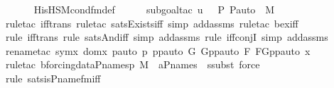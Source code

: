\begin{isabellebody}
\ \ \ \ \isamarkupfalse%
\ His{\isacharunderscore}{\kern0pt}HS{\isacharunderscore}{\kern0pt}M{\isacharunderscore}{\kern0pt}cond{\isacharunderscore}{\kern0pt}fm{\isacharunderscore}{\kern0pt}def\ \isanewline
\ \ \ \ \isamarkupfalse%
{\isacharparenleft}{\kern0pt}subgoal{\isacharunderscore}{\kern0pt}tac\ {\isachardoublequoteopen}{\isasymlangle}u{\isacharcomma}{\kern0pt}\ {\isasymF}{\isacharcomma}{\kern0pt}\ {\isasymG}{\isacharcomma}{\kern0pt}\ P{\isacharcomma}{\kern0pt}\ P{\isacharunderscore}{\kern0pt}auto{\isasymrangle}\ {\isasymin}\ M{\isachardoublequoteclose}{\isacharparenright}{\kern0pt}\isanewline
\ \ \ \ \ \isamarkupfalse%
{\isacharparenleft}{\kern0pt}rule{\isacharunderscore}{\kern0pt}tac\ iff{\isacharunderscore}{\kern0pt}trans{\isacharcomma}{\kern0pt}\ rule{\isacharunderscore}{\kern0pt}tac\ sats{\isacharunderscore}{\kern0pt}Exists{\isacharunderscore}{\kern0pt}iff{\isacharcomma}{\kern0pt}\ simp\ add{\isacharcolon}{\kern0pt}assms{\isacharcomma}{\kern0pt}\ rule{\isacharunderscore}{\kern0pt}tac\ bex{\isacharunderscore}{\kern0pt}iff{\isacharparenright}{\kern0pt}{\isacharplus}{\kern0pt}\isanewline
\ \ \ \ \ \isamarkupfalse%
{\isacharparenleft}{\kern0pt}rule\ iff{\isacharunderscore}{\kern0pt}trans{\isacharcomma}{\kern0pt}\ rule\ sats{\isacharunderscore}{\kern0pt}And{\isacharunderscore}{\kern0pt}iff{\isacharcomma}{\kern0pt}\ simp\ add{\isacharcolon}{\kern0pt}assms{\isacharcomma}{\kern0pt}\ rule\ iff{\isacharunderscore}{\kern0pt}conjI{}{\isacharcomma}{\kern0pt}\ simp\ add{\isacharcolon}{\kern0pt}assms{\isacharparenright}{\kern0pt}{\isacharplus}{\kern0pt}\isanewline
\ \ \ \ \ \ \isamarkupfalse%
{\isacharparenleft}{\kern0pt}rename{\isacharunderscore}{\kern0pt}tac\ symx\ domx\ pauto\ p\ ppauto\ G\ Gppauto\ F\ FGppauto\ x{\isacharparenright}{\kern0pt}\isanewline
\ \ \ \ \ \ \isamarkupfalse%
{\isacharparenleft}{\kern0pt}rule{\isacharunderscore}{\kern0pt}tac\ b{\isacharequal}{\kern0pt}{\isachardoublequoteopen}forcing{\isacharunderscore}{\kern0pt}data{\isachardot}{\kern0pt}P{\isacharunderscore}{\kern0pt}names{\isacharparenleft}{\kern0pt}p{\isacharcomma}{\kern0pt}\ M{\isacharparenright}{\kern0pt}{\isachardoublequoteclose}\ \ a{\isacharequal}{\kern0pt}P{\isacharunderscore}{\kern0pt}names\ \ ssubst{\isacharcomma}{\kern0pt}\ force{\isacharparenright}{\kern0pt}\isanewline
\ \ \ \ \ \ \isamarkupfalse%
{\isacharparenleft}{\kern0pt}rule\ sats{\isacharunderscore}{\kern0pt}is{\isacharunderscore}{\kern0pt}P{\isacharunderscore}{\kern0pt}name{\isacharunderscore}{\kern0pt}fm{\isacharunderscore}{\kern0pt}iff{\isacharparenright}{\kern0pt}\isanewline

\end{isabellebody}
